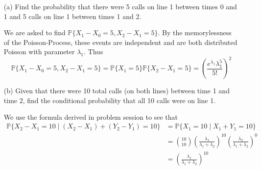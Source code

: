\documentclass[11pt]{article}
\newcommand{\bbP}{\mathbb{P}}
\begin{document}
\begin{enumerate}
    \item[(a)] Find the probability that there were 5 calls on line 1 between times 0 and 1 and 5 calls on line 1 between times 1 and 2.
    \begin{solution}
    We are asked to find $\bbP\{X_1 - X_0 = 5, X_2 - X_1 = 5\}.$ By the memorylessness of the Poisson-Process, these events are independent and are both distributed Poisson with parameter $\lambda_1.$ Thus
    \[\bbP\{X_1 - X_0 = 5, X_2 - X_1 = 5\}= \bbP\{X_1 = 5\}\bbP\{X_2 - X_1 = 5\} = \boxed{(\frac{e^{\lambda_1}\lambda_1^5}{5!})^2}\]
    \end{solution}
    \item[(b)] Given that there were 10 total calls (on both lines) between time 1 and time 2, find the conditional probability that all 10 calls were on line 1.
    \begin{solution}
        We use the formula derived in problem session to see that 
        \begin{align*}
        \bbP\{X_2 - X_1 = 10 \mid (X_2 - X_1) + (Y_2 - Y_1) = 10\}& = \bbP\{X_1 = 10 \mid X_1 + Y_1 = 10\}\\ &= \binom{10}{10}(\frac{\lambda_1}{\lambda_1 + \lambda_2})^{10}(\frac{\lambda_2}{\lambda_1 + \lambda_2})^{0}\\ &= \boxed{(\frac{\lambda_1}{\lambda_1 + \lambda_2})^{10}    }
        \end{align*}
        

\end{solution}
\end{enumerate}
\end{document}
